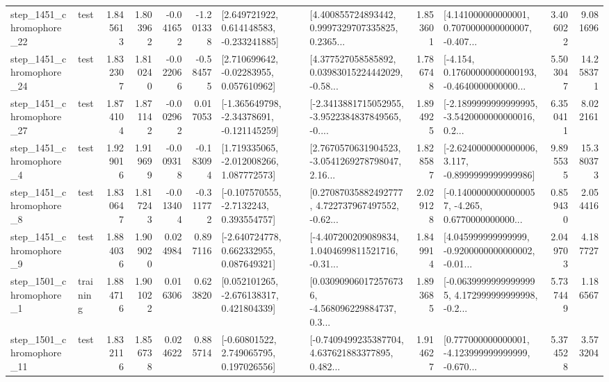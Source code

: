 \begin{tabular}{llrrrrllrlrr}
 step\_1451\_chromophore\_22 &      test &      1.845613 &    1.803962 &     -0.041652 & -1.201338 &    [2.649721922, 0.614148583, -0.233241885] &  [4.400855724893442, 0.9997329707335825, 0.2365... &       1.853601 &  [4.141000000000001, 0.7070000000000007, -0.407... &            3.406022 &          9.081696 \\
 step\_1451\_chromophore\_24 &      test &      1.832307 &    1.810240 &     -0.022066 & -0.584575 &     [2.710699642, -0.02283955, 0.057610962] &  [4.377527058585892, 0.03983015224442029, -0.58... &       1.786748 &  [-4.154, 0.17600000000000193, -0.4640000000000... &            5.503047 &         14.258371 \\
 step\_1451\_chromophore\_27 &      test &      1.874104 &    1.871142 &     -0.002962 &  0.017053 &   [-1.365649798, -2.34378691, -0.121145259] &  [-2.3413881715052955, -3.9522384837849565, -0.... &       1.894925 &  [-2.1899999999999995, -3.5420000000000016, 0.2... &            6.350411 &          8.022161 \\
  step\_1451\_chromophore\_4 &      test &      1.929016 &    1.919699 &     -0.009318 & -0.183094 &    [1.719335065, -2.012008266, 1.087772573] &  [2.7670570631904523, -3.0541269278798047, 2.16... &       1.828587 &  [-2.6240000000000006, 3.117, -0.8999999999999986] &            9.895535 &         15.380373 \\
  step\_1451\_chromophore\_8 &      test &      1.830647 &    1.817243 &     -0.013404 & -0.311772 &     [-0.107570555, -2.7132243, 0.393554757] &  [0.27087035882492777, 4.722737967497552, -0.62... &       2.029128 &  [-0.14000000000000057, -4.265, 0.6770000000000... &            0.859430 &          2.054416 \\
  step\_1451\_chromophore\_9 &      test &      1.884036 &    1.909020 &      0.024984 &  0.897116 &    [-2.640724778, 0.662332955, 0.087649321] &  [-4.407200209089834, 1.0404699811521716, -0.31... &       1.849914 &  [4.045999999999999, -0.9200000000000002, -0.01... &            2.049703 &          4.187727 \\
  step\_1501\_chromophore\_1 &  training &      1.884716 &    1.901022 &      0.016306 &  0.623820 &    [0.052101265, -2.676138317, 0.421804339] &  [0.030909060172576736, -4.568096229884737, 0.3... &       1.893685 &  [-0.06399999999999995, 4.172999999999998, -0.2... &            5.737449 &          1.186567 \\
 step\_1501\_chromophore\_11 &      test &      1.832116 &    1.856738 &      0.024622 &  0.885714 &     [-0.60801522, 2.749065795, 0.197026556] &  [-0.7409499235387704, 4.637621883377895, 0.482... &       1.914627 &  [0.777000000000001, -4.123999999999999, -0.670... &            5.374528 &          3.573204 \\

\end{tabular}
